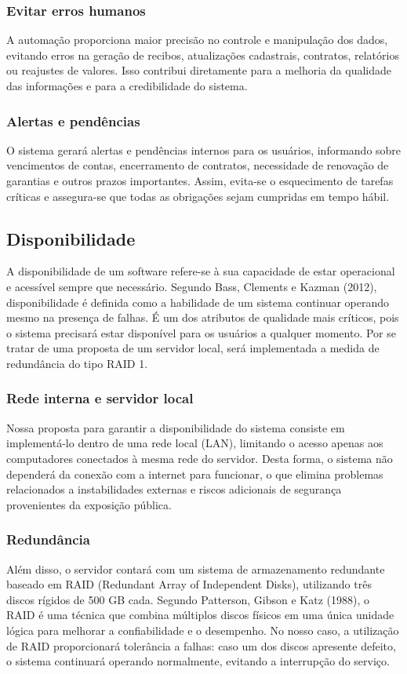 \documentclass[../main.tex]{subfiles}
\begin{document}
    \subsubsection{Evitar erros humanos} 
    A automação proporciona maior precisão no controle e manipulação dos dados, evitando erros na geração de recibos, atualizações 
    cadastrais, contratos, relatórios ou reajustes de valores. Isso contribui diretamente para a melhoria da qualidade das informações 
    e para a credibilidade do sistema.

    \subsubsection{Alertas e pendências} 
    O sistema gerará alertas e pendências internos para os usuários, informando sobre vencimentos de contas, encerramento de contratos, 
    necessidade de renovação de garantias e outros prazos importantes. Assim, evita-se o esquecimento de tarefas críticas e assegura-se 
    que todas as obrigações sejam cumpridas em tempo hábil.

    
\subsection{Disponibilidade}
A disponibilidade de um software refere-se à sua capacidade de estar operacional e acessível sempre que necessário. 
Segundo Bass, Clements e Kazman (2012), disponibilidade é definida como a habilidade de um sistema continuar operando 
mesmo na presença de falhas. É um dos atributos de qualidade mais críticos, pois o sistema precisará estar disponível
para os usuários a qualquer momento. Por se tratar de uma proposta de um servidor local, será implementada a medida 
de redundância do tipo RAID 1.
    \subsubsection{Rede interna e servidor local}
    Nossa proposta para garantir a disponibilidade do sistema consiste em implementá-lo dentro de uma rede local (LAN), 
    limitando o acesso apenas aos computadores conectados à mesma rede do servidor. Desta forma, o sistema não dependerá 
    da conexão com a internet para funcionar, o que elimina problemas relacionados a instabilidades externas e riscos 
    adicionais de segurança provenientes da exposição pública.
    \subsubsection{Redundância}
    Além disso, o servidor contará com um sistema de armazenamento redundante baseado em RAID (Redundant Array of Independent Disks), 
    utilizando três discos rígidos de 500 GB cada. Segundo Patterson, Gibson e Katz (1988), o RAID é uma técnica que combina múltiplos 
    discos físicos em uma única unidade lógica para melhorar a confiabilidade e o desempenho. No nosso caso, a utilização de RAID 
    proporcionará tolerância a falhas: caso um dos discos apresente defeito, o sistema continuará operando normalmente, evitando a 
    interrupção do serviço.
\end{document}
